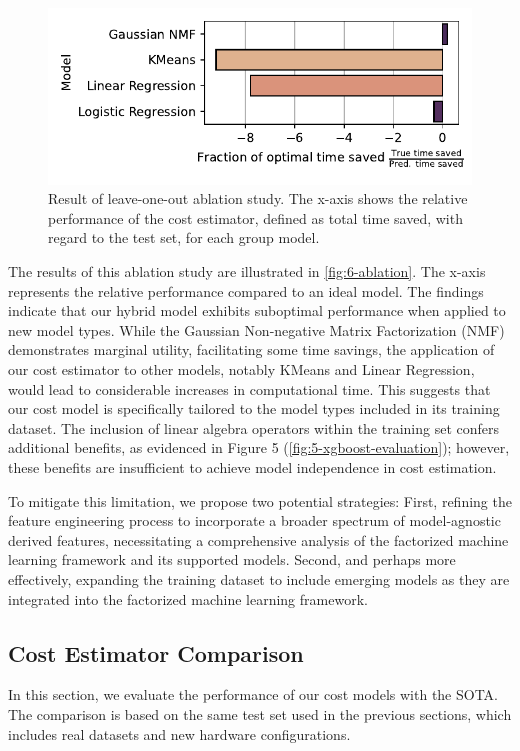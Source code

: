 \begin{figure}[ht]
    \centering
    \includegraphics[width=0.6\linewidth]{chapters/06_evaluation/figures/hybrid-ablation.pdf}
    \caption[Results of ablation study]{Result of leave-one-out ablation study. The x-axis shows the relative performance of the cost estimator, defined as total time saved, with regard to the test set, for each group model.}
    \label{fig:6-ablation}
\end{figure}

The results of this ablation study are illustrated in \autoref{fig:6-ablation}. The x-axis represents the relative performance compared to an ideal model. The findings indicate that our hybrid model exhibits suboptimal performance when applied to new model types. While the Gaussian Non-negative Matrix Factorization (NMF) demonstrates marginal utility, facilitating some time savings, the application of our cost estimator to other models, notably KMeans and Linear Regression, would lead to considerable increases in computational time. This suggests that our cost model is specifically tailored to the model types included in its training dataset. The inclusion of linear algebra operators within the training set confers additional benefits, as evidenced in Figure 5 (\autoref{fig:5-xgboost-evaluation}); however, these benefits are insufficient to achieve model independence in cost estimation.

To mitigate this limitation, we propose two potential strategies: First, refining the feature engineering process to incorporate a broader spectrum of model-agnostic derived features, necessitating a comprehensive analysis of the factorized machine learning framework and its supported models. Second, and perhaps more effectively, expanding the training dataset to include emerging models as they are integrated into the factorized machine learning framework.

\subsection{Cost Estimator Comparison}
\label{subsec:6-sota-comparison}
In this section, we evaluate the performance of our cost models with the SOTA. The comparison is based on the same test set used in the previous sections, which includes real datasets and new hardware configurations.

